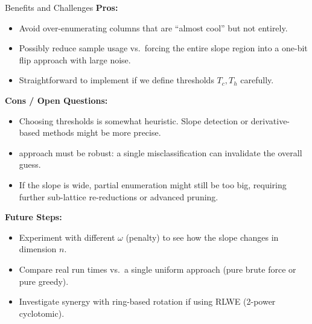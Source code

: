 \documentclass{beamer}
\begin{document}
\begin{frame}{Benefits and Challenges}
\textbf{Pros:}
\begin{itemize}
  \item Avoid over-enumerating columns that are ``almost cool'' but not entirely.
  \item Possibly reduce sample usage vs.\ forcing the entire slope region into a one-bit flip approach with large noise.
  \item Straightforward to implement if we define thresholds $T_c, T_h$ carefully.
\end{itemize}

\textbf{Cons / Open Questions:}
\begin{itemize}
  \item Choosing thresholds is somewhat heuristic. Slope detection or derivative-based methods might be more precise.
  \item {} approach must be robust: a single misclassification can invalidate the overall guess.
  \item If the slope is wide, partial enumeration might still be too big, requiring further sub-lattice re-reductions or advanced pruning.
\end{itemize}

\textbf{Future Steps:}
\begin{itemize}
  \item Experiment with different $\omega$ (penalty) to see how the slope changes in dimension $n$.
  \item Compare real run times vs.\ a single uniform approach (pure brute force or pure greedy).
  \item Investigate synergy with ring-based rotation if using RLWE (2-power cyclotomic).
\end{itemize}
\end{frame}
\end{document}
